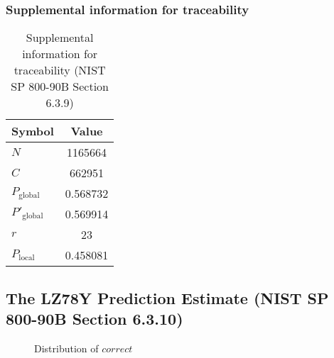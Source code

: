 \documentclass[a3paper,xelatex,english]{bxjsarticle}
\begin{document}
\subsubsection{Supplemental information for traceability}
\renewcommand{\arraystretch}{1.8}
\begin{table}[h]
\caption{Supplemental information for traceability (NIST SP 800-90B Section 6.3.9)}
\begin{center}
\begin{tabular}{|l|c|}
\hline 
\rowcolor{anotherlightblue} %
Symbol				& Value \\ \hline 
$N$				& 1165664\\ \hline 
$C$				& 662951\\ \hline 
$P_{\textrm{global}}$				& 0.568732\\ \hline 
$P'_{\textrm{global}}$			& 0.569914\\ \hline 
$r$				& 23\\ \hline 
$P_{\textrm{local}}$ 			& 0.458081\\ \hline
\end{tabular}
\end{center}
\end{table}
\renewcommand{\arraystretch}{1.4}
\clearpage
\subsection{The LZ78Y Prediction Estimate (NIST SP 800-90B Section 6.3.10)}
\begin{figure}[htbp]
\caption{Distribution of $correct$}
\end{figure}
\end{document}

